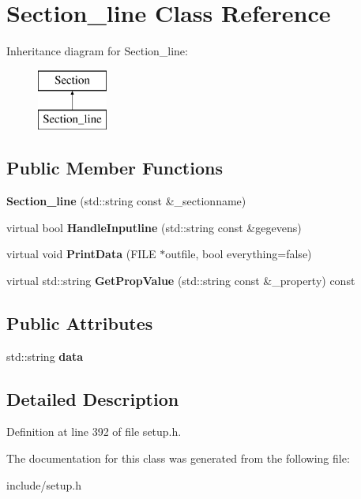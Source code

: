 \hypertarget{classSection__line}{\section{Section\-\_\-line Class Reference}
\label{classSection__line}
}
Inheritance diagram for Section\-\_\-line\-:\begin{figure}[H]
\begin{center}
\leavevmode
\includegraphics[height=2.000000cm]{classSection__line}
\end{center}
\end{figure}
\subsection*{Public Member Functions}
\begin{DoxyCompactItemize}
\item 
\hypertarget{classSection__line_ab79823a6ed5b8580e8f197d0c546de55}{{\bfseries Section\-\_\-line} (std\-::string const \&\-\_\-sectionname)}\label{classSection__line_ab79823a6ed5b8580e8f197d0c546de55}

\item 
\hypertarget{classSection__line_a55fad813b8986d2c61c67350eb11925a}{virtual bool {\bfseries Handle\-Inputline} (std\-::string const \&gegevens)}\label{classSection__line_a55fad813b8986d2c61c67350eb11925a}

\item 
\hypertarget{classSection__line_ac89ce37c06ce0f05f827c355148be0a4}{virtual void {\bfseries Print\-Data} (F\-I\-L\-E $\ast$outfile, bool everything=false)}\label{classSection__line_ac89ce37c06ce0f05f827c355148be0a4}

\item 
\hypertarget{classSection__line_a7e73f848c2043d6f1b35dc3b252ca748}{virtual std\-::string {\bfseries Get\-Prop\-Value} (std\-::string const \&\-\_\-property) const }\label{classSection__line_a7e73f848c2043d6f1b35dc3b252ca748}

\end{DoxyCompactItemize}
\subsection*{Public Attributes}
\begin{DoxyCompactItemize}
\item 
\hypertarget{classSection__line_a9a389941bb8990829a82fb8b41a06b70}{std\-::string {\bfseries data}}\label{classSection__line_a9a389941bb8990829a82fb8b41a06b70}

\end{DoxyCompactItemize}


\subsection{Detailed Description}


Definition at line 392 of file setup.\-h.



The documentation for this class was generated from the following file\-:\begin{DoxyCompactItemize}
\item 
include/setup.\-h\end{DoxyCompactItemize}

